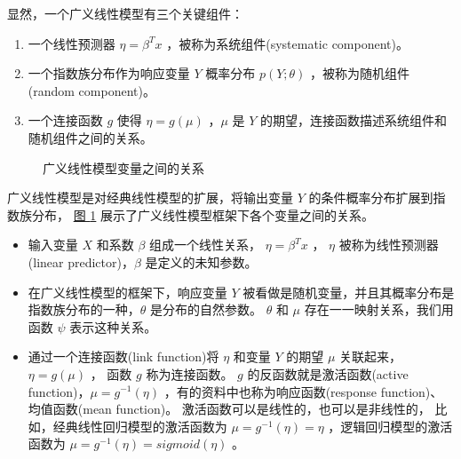 \documentclass[letterpaper,10pt,english]{sphinxmanual}
\begin{document}

显然，一个广义线性模型有三个关键组件：
\begin{enumerate}
%
\item {} 
一个线性预测器 \(\eta=\beta^T x\) ，被称为系统组件(systematic component)。

\item {} 
一个指数族分布作为响应变量 \(Y\) 概率分布 \(p(Y;\theta)\) ，被称为随机组件(random component)。

\item {} 
一个连接函数 \(g\) 使得 \(\eta=g(\mu)\) ，\(\mu\) 是 \(Y\) 的期望，连接函数描述系统组件和随机组件之间的关系。

\end{enumerate}

\begin{figure}[htbp]
\centering
\capstart

\noindent{}
\caption{广义线性模型变量之间的关系}\label{\detokenize{_u5e7f_u4e49_u7ebf_u6027_u6a21_u578b/content:id9}}\label{\detokenize{_u5e7f_u4e49_u7ebf_u6027_u6a21_u578b/content:fg-34-1}}\end{figure}

广义线性模型是对经典线性模型的扩展，将输出变量 \(Y\) 的条件概率分布扩展到指数族分布，
\hyperref[\detokenize{_u5e7f_u4e49_u7ebf_u6027_u6a21_u578b/content:fg-34-1}]{图 \ref{\detokenize{_u5e7f_u4e49_u7ebf_u6027_u6a21_u578b/content:fg-34-1}}} 展示了广义线性模型框架下各个变量之间的关系。
\begin{itemize}
\item {} 
输入变量 \(X\) 和系数 \(\beta\) 组成一个线性关系， \(\eta=\beta^T x\) ，
\(\eta\) 被称为线性预测器(linear predictor)，\(\beta\) 是定义的未知参数。

\item {} 
在广义线性模型的框架下，响应变量 \(Y\) 被看做是随机变量，并且其概率分布是指数族分布的一种，\(\theta\) 是分布的自然参数。
\(\theta\) 和 \(\mu\) 存在一一映射关系，我们用函数 \(\psi\) 表示这种关系。

\item {} 
通过一个连接函数(link function)将 \(\eta\) 和变量 \(Y\) 的期望 \(\mu\) 关联起来，\(\eta=g(\mu)\) ，
函数 \(g\) 称为连接函数。 \(g\) 的反函数就是激活函数(active function)，\(\mu=g^{-1}(\eta)\)
，有的资料中也称为响应函数(response function)、均值函数(mean function)。
激活函数可以是线性的，也可以是非线性的，
比如，经典线性回归模型的激活函数为 \(\mu=g^{-1}(\eta)=\eta\) ，逻辑回归模型的激活函数为 \(\mu=g^{-1}(\eta)=sigmoid(\eta)\) 。

\end{itemize}
\end{document}

